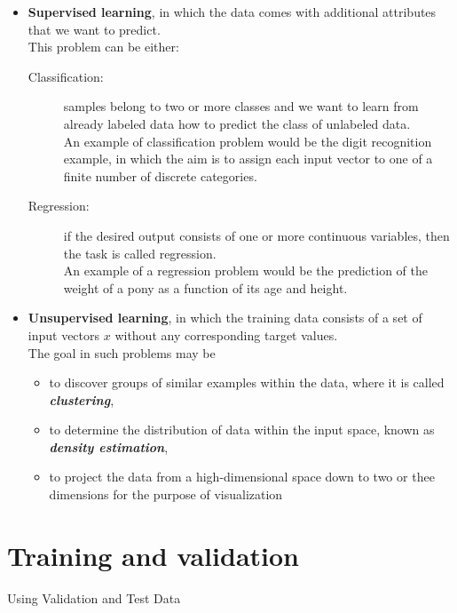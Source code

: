 \documentclass[]{article}
\begin{document}
	\begin{itemize}
		\item \textbf{Supervised learning}, in which the data comes with additional attributes that we want to predict.\\ 
		\bigskip
		This problem can be either:
		\begin{description}
			\item[Classification:] samples belong to two or more classes and we want to learn from already labeled data how
			to predict the class of unlabeled data. \\ An example of classification problem would be the digit recognition
			example, in which the aim is to assign each input vector to one of a finite number of discrete categories.
			\item[Regression:] if the desired output consists of one or more continuous variables, then the task is called
			regression. \\ An example of a regression problem would be the prediction of the weight of a pony as a
			function of its age and height.
		\end{description}
		
		\newpage
		\item  \textbf{Unsupervised learning}, in which the training data consists of a set of input vectors $x$ without any corresponding
		target values. \\ \bigskip The goal in such problems may be
		\begin{itemize}
			\item to discover groups of similar examples within the data, where
			it is called \textbf{\textit{clustering}}, \item to determine the distribution of data within the input space, known as \textbf{\textit{density estimation}},
			\item to project the data from a high-dimensional space down to two or thee dimensions for the purpose of
			visualization 
		\end{itemize}
	\end{itemize}
	
\newpage

\section{Training and validation}
Using Validation and Test Data
\end{document}
